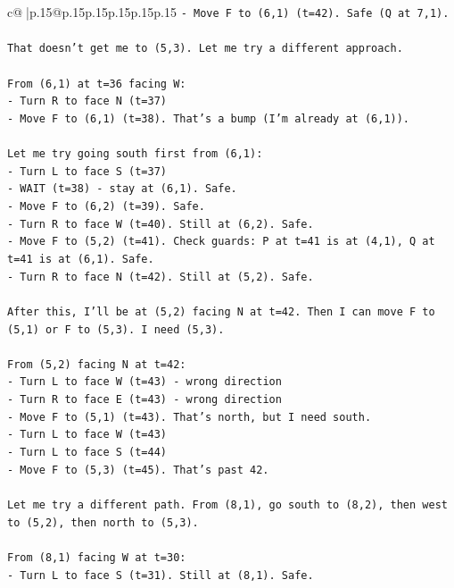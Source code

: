 \documentclass{article}
\begin{document}
{\begin{supertabular}{c@{$\;$}|p{.15\linewidth}@{}p{.15\linewidth}p{.15\linewidth}p{.15\linewidth}p{.15\linewidth}p{.15\linewidth}}
{{{\texttt{{-} Move F to (6,1) (t=42). Safe (Q at 7,1).} \\
\\ 
\texttt{That doesn't get me to (5,3). Let me try a different approach.} \\
\\ 
\texttt{From (6,1) at t=36 facing W:} \\
\texttt{{-} Turn R to face N (t=37)} \\
\texttt{{-} Move F to (6,1) (t=38). That's a bump (I'm already at (6,1)).} \\
\\ 
\texttt{Let me try going south first from (6,1):} \\
\texttt{{-} Turn L to face S (t=37)} \\
\texttt{{-} WAIT (t=38) {-} stay at (6,1). Safe.} \\
\texttt{{-} Move F to (6,2) (t=39). Safe.} \\
\texttt{{-} Turn R to face W (t=40). Still at (6,2). Safe.} \\
\texttt{{-} Move F to (5,2) (t=41). Check guards: P at t=41 is at (4,1), Q at t=41 is at (6,1). Safe.} \\
\texttt{{-} Turn R to face N (t=42). Still at (5,2). Safe.} \\
\\ 
\texttt{After this, I'll be at (5,2) facing N at t=42. Then I can move F to (5,1) or F to (5,3). I need (5,3).} \\
\\ 
\texttt{From (5,2) facing N at t=42:} \\
\texttt{{-} Turn L to face W (t=43) {-} wrong direction} \\
\texttt{{-} Turn R to face E (t=43) {-} wrong direction} \\
\texttt{{-} Move F to (5,1) (t=43). That's north, but I need south.} \\
\texttt{{-} Turn L to face W (t=43)} \\
\texttt{{-} Turn L to face S (t=44)} \\
\texttt{{-} Move F to (5,3) (t=45). That's past 42.} \\
\\ 
\texttt{Let me try a different path. From (8,1), go south to (8,2), then west to (5,2), then north to (5,3).} \\
\\ 
\texttt{From (8,1) facing W at t=30:} \\
\texttt{{-} Turn L to face S (t=31). Still at (8,1). Safe.} \\
}}}
\end{supertabular}}
\end{document}
